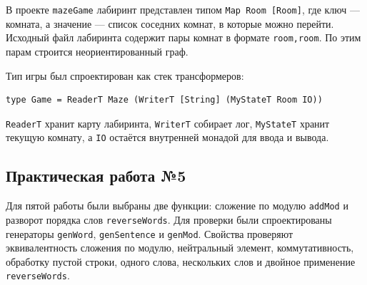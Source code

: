 В проекте \texttt{mazeGame} лабиринт представлен типом \texttt{Map Room [Room]}, где ключ --- комната, а значение --- список соседних комнат, в которые можно перейти. Исходный файл лабиринта содержит пары комнат в формате \texttt{room,room}. По этим парам строится неориентированный граф.

Тип игры был спроектирован как стек трансформеров:

\label{lst:game-type}
\begin{verbatim}
type Game = ReaderT Maze (WriterT [String] (MyStateT Room IO))
\end{verbatim}

\texttt{ReaderT} хранит карту лабиринта, \texttt{WriterT} собирает лог, \texttt{MyStateT} хранит текущую комнату, а \texttt{IO} остаётся внутренней монадой для ввода и вывода.

\subsection{Практическая работа №5}

Для пятой работы были выбраны две функции: сложение по модулю \texttt{addMod} и разворот порядка слов \texttt{reverseWords}. Для проверки были спроектированы генераторы \texttt{genWord}, \texttt{genSentence} и \texttt{genMod}. Свойства проверяют эквивалентность сложения по модулю, нейтральный элемент, коммутативность, обработку пустой строки, одного слова, нескольких слов и двойное применение \texttt{reverseWords}.

\newpage
